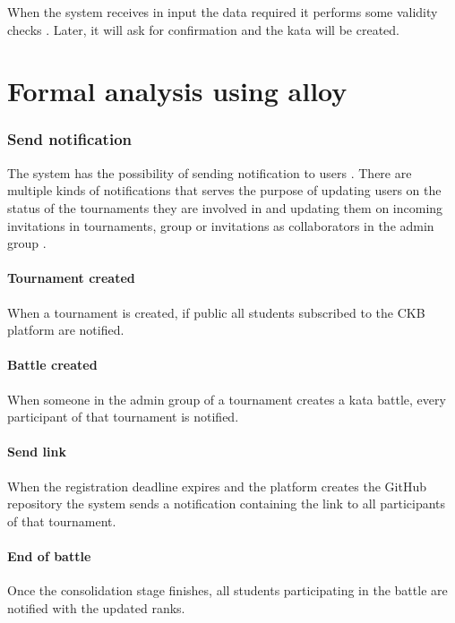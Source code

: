 \documentclass{article}
\newcommand{\adminGroup}{admin group }
\newcommand{\participant}{participant }
\newcommand{\participants}{participants }
\newcommand{\users}{users }
\begin{document}
                When the system receives in input the data required it performs some validity checks
                .
                 Later, it will ask for confirmation and the kata will be created.
\section{Formal analysis using alloy}
\subsubsection{Send notification}
                The system has the possibility of sending notification to \users. There are multiple kinds of notifications that serves the purpose of updating \users on the status of the tournaments they are involved in and updating them on incoming invitations in tournaments, group or invitations as collaborators in the \adminGroup.
            
            
                \paragraph{Tournament created}
                     When a tournament is created, if public
                     all students subscribed to the CKB platform are notified.

                \paragraph{Battle created}
                    When someone in the \adminGroup of a tournament creates a kata battle, every \participant of that tournament is notified.
                \paragraph*{Send link}
                    When the registration deadline expires and the platform creates the GitHub repository the system sends a notification containing the link to all \participants of that tournament.
                \paragraph*{End of battle}
                    Once the consolidation stage finishes, all students participating in the battle are notified with the updated ranks.
                
\end{document}
